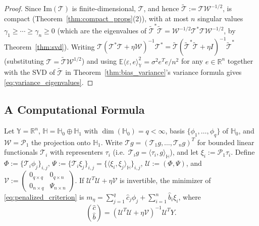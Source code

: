 \begin{proof}
Since $\mathrm{Im}(\mathcal{T})$ is finite-dimensional, $\mathcal{T}$, and
hence $\widetilde{\mathcal{T}}:=\mathcal{T}\mathcal{W}^{-1/2}$, is compact
(Theorem~\ref{thm:compact_props}(2)), with at most $n$ singular values
$\gamma_1\geq\cdots\geq\gamma_n\geq 0$ (which are the eigenvalues of
$\widetilde{\mathcal{T}}^*\widetilde{\mathcal{T}}=\mathcal{W}^{-1/2}
\mathcal{T}^*\mathcal{T}\mathcal{W}^{-1/2}$, by Theorem~\ref{thm:svd}).
Writing $\mathcal{T}(\mathcal{T}^*\mathcal{T}+\eta\mathcal{W})^{-1}
\mathcal{T}^* = \widetilde{\mathcal{T}}(\widetilde{\mathcal{T}}^*
\widetilde{\mathcal{T}}+\eta I)^{-1}\widetilde{\mathcal{T}}^*$ (substituting
$\mathcal{T}=\widetilde{\mathcal{T}}\mathcal{W}^{1/2}$) and using
$\mathbb{E}\langle\varepsilon,e\rangle_{\mathbb{Y}}^2=\sigma^2e^Te/n^2$ for
any $e\in\mathbb{R}^n$ together with the SVD of $\widetilde{\mathcal{T}}$
in Theorem~\ref{thm:bias_variance}'s variance formula gives
\eqref{eq:variance_eigenvalues}.
\end{proof}

\subsection{A Computational Formula}
\label{subsec:computational_formula}

\begin{theorem}
\label{thm:computational_formula}
Let $\mathbb{Y}=\mathbb{R}^n$, $\mathbb{H}=\mathbb{H}_0\oplus\mathbb{H}_1$
with $\dim(\mathbb{H}_0)=q<\infty$, basis $\{\phi_1,\dots,\phi_q\}$ of
$\mathbb{H}_0$, and $\mathcal{W}=\mathcal{P}_1$ the projection onto
$\mathbb{H}_1$. Write $\mathcal{T}g=(\mathcal{T}_1g,\dots,\mathcal{T}_ng)^T$
for bounded linear functionals $\mathcal{T}_i$ with representers $\tau_i$
(i.e.\ $\mathcal{T}_ig=\langle\tau_i,g\rangle_{\mathbb{H}}$), and let
$\xi_i:=\mathcal{P}_1\tau_i$. Define $\Phi:=\{\mathcal{T}_i\phi_j\}_{i,j}$,
$\Psi:=\{\mathcal{T}_i\xi_j\}_{i,j}=\{\langle\xi_i,\xi_j\rangle_{\mathbb{H}}
\}_{i,j}$, $\mathcal{U}:=(\Phi,\Psi)$, and $\mathcal{V}:=
\left(\begin{smallmatrix}0_{q\times q}&0_{q\times n}\\0_{n\times q}&
\Psi_{n\times n}\end{smallmatrix}\right)$. If $\mathcal{U}^T\mathcal{U}+
\eta\mathcal{V}$ is invertible, the minimizer of
\eqref{eq:penalized_criterion} is $m_\eta = \sum_{j=1}^q\widehat{c}_j
\phi_j+\sum_{i=1}^n\widehat{b}_i\xi_i$, where
\begin{equation}
\binom{\widehat{c}}{\widehat{b}} = (\mathcal{U}^T\mathcal{U}+\eta
\mathcal{V})^{-1}\mathcal{U}^TY.
\label{eq:computational_formula}
\end{equation}
\end{theorem}

